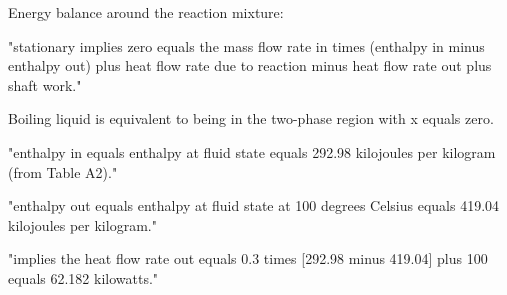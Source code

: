 Energy balance around the reaction mixture:

"stationary implies zero equals the mass flow rate in times (enthalpy in minus enthalpy out) plus heat flow rate due to reaction minus heat flow rate out plus shaft work."

Boiling liquid is equivalent to being in the two-phase region with x equals zero.

"enthalpy in equals enthalpy at fluid state equals 292.98 kilojoules per kilogram (from Table A2)."

"enthalpy out equals enthalpy at fluid state at 100 degrees Celsius equals 419.04 kilojoules per kilogram."

"implies the heat flow rate out equals 0.3 times [292.98 minus 419.04] plus 100 equals 62.182 kilowatts."